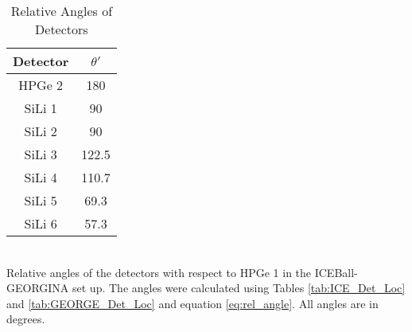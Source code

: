 \begin{table}[]
    \centering
    \caption{Relative Angles of Detectors}
    \begin{tabular}{c|c} \toprule
         Detector & $\theta '$  \\
         \hline 
         HPGe 2 & 180 \\
         SiLi 1 & 90\\
         SiLi 2 & 90\\
         SiLi 3 & 122.5\\
         SiLi 4 & 110.7\\
         SiLi 5 & 69.3 \\
         SiLi 6 & 57.3 \\ \bottomrule
    \end{tabular}
    \\[2pt]
    \footnotesize
    Relative angles of the detectors with respect to HPGe 1 in the ICEBall-GEORGINA set up. The angles were calculated using Tables \ref{tab:ICE_Det_Loc} and \ref{tab:GEORGE_Det_Loc} and equation \ref{eq:rel_angle}. All angles are in degrees.
    \label{tab:rel_angle_g}
\end{table}